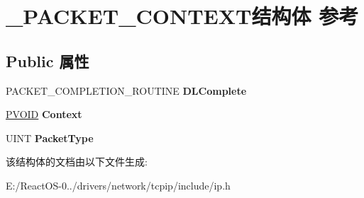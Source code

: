 \hypertarget{struct___p_a_c_k_e_t___c_o_n_t_e_x_t}{}\section{\+\_\+\+P\+A\+C\+K\+E\+T\+\_\+\+C\+O\+N\+T\+E\+X\+T结构体 参考}
\label{struct___p_a_c_k_e_t___c_o_n_t_e_x_t}
\subsection*{Public 属性}
\begin{DoxyCompactItemize}
\item 
\mbox{\label{struct___p_a_c_k_e_t___c_o_n_t_e_x_t_a8e431220b3f0fa4e07a820fb20b3bee9}} 
P\+A\+C\+K\+E\+T\+\_\+\+C\+O\+M\+P\+L\+E\+T\+I\+O\+N\+\_\+\+R\+O\+U\+T\+I\+NE {\bfseries D\+L\+Complete}
\item 
\mbox{\label{struct___p_a_c_k_e_t___c_o_n_t_e_x_t_ae1756078c32790c8042798aa34bc0629}} 
\hyperlink{interfacevoid}{P\+V\+O\+ID} {\bfseries Context}
\item 
\mbox{\label{struct___p_a_c_k_e_t___c_o_n_t_e_x_t_a524eda7080738d958471fece7ca18948}} 
U\+I\+NT {\bfseries Packet\+Type}
\end{DoxyCompactItemize}


该结构体的文档由以下文件生成\+:\begin{DoxyCompactItemize}
\item 
E\+:/\+React\+O\+S-\/0../drivers/network/tcpip/include/ip.\+h\end{DoxyCompactItemize}
